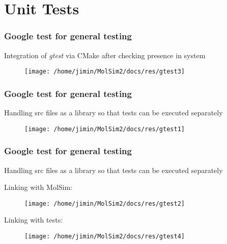 \section{Unit Tests}

\begin{frame}
    \frametitle{Google test for general testing}

        Integration of \emph{gtest} via CMake after checking presence in system

    \begin{figure}[H]
        \texttt{[image: /home/jimin/MolSim2/docs/res/gtest3]}
    \end{figure}


\end{frame}

\begin{frame}
    \frametitle{Google test for general testing}

        Handling src files as a library so that tests can be executed separately

    \begin{figure}[H]
        \texttt{[image: /home/jimin/MolSim2/docs/res/gtest1]}
    \end{figure}


\end{frame}

\begin{frame}
    \frametitle{Google test for general testing}

        Handling src files as a library so that tests can be executed separately

    Linking with MolSim:
    \begin{figure}[H]
        \texttt{[image: /home/jimin/MolSim2/docs/res/gtest2]}
    \end{figure}

    Linking with tests:
    \begin{figure}[H]
        \texttt{[image: /home/jimin/MolSim2/docs/res/gtest4]}
    \end{figure}

\end{frame}

